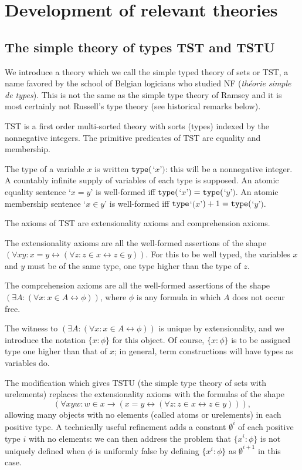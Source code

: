 \documentclass[112pt]{article}
\begin{document}

\section{Development of relevant theories}

\subsection{The simple theory of types TST and TSTU}

We introduce a theory which we call the simple typed theory of sets or TST, a name favored by the school of Belgian logicians who studied NF ({\em th\'eorie simple de types}).  This is not the same as the simple type theory of Ramsey and it is most certainly not Russell's type theory  (see historical remarks below).

TST is a first order multi-sorted theory with sorts (types) indexed by the nonnegative integers.  The primitive predicates of TST are equality and membership.

The type of a variable $x$ is written ${\tt type}($`$x$'$)$:  this will be a nonnegative integer.   A countably infinite supply of variables of each type is supposed.  An atomic equality sentence `$x=y$' is well-formed iff ${\tt type}($`$x$'$)={\tt type}($`$y$'$)$.
An atomic membership sentence `$x \in y$' is well-formed iff ${\tt type}$`$(x$'$)+1 = {\tt type}($`$y$'$)$.

The axioms of TST are extensionality axioms and comprehension axioms.

The extensionality axioms are all the well-formed assertions of the shape $(\forall xy:x=y \leftrightarrow (\forall z:z \in x \leftrightarrow z\in y))$.  For this to be well typed, the variables
$x$ and $y$ must be of the same type, one type higher than the type of $z$.

The comprehension axioms are all the well-formed assertions of the shape $(\exists A:(\forall x:x \in A \leftrightarrow \phi))$, where $\phi$ is any formula in which $A$ does not occur free.

The witness to $(\exists A:(\forall x:x \in A \leftrightarrow \phi))$ is unique by extensionality, and we introduce the notation $\{x:\phi\}$ for this object.  Of course, $\{x:\phi\}$  is to be assigned type one higher than that of $x$;  in general, term constructions will have types as variables do.

The modification which gives TSTU (the simple type theory of sets with urelements) replaces the extensionality axioms with the formulas of the shape $$(\forall xyw:w \in x \rightarrow (x=y \leftrightarrow (\forall z:z \in x \leftrightarrow z\in y))),$$  allowing many objects with no elements (called atoms or urelements)  in each positive type.  A technically useful refinement adds a constant $\emptyset^i$ of each positive type $i$ with no elements:  we can then address the problem that $\{x^i:\phi\}$ is not uniquely defined when $\phi$ is uniformly false by defining $\{x^i:\phi\}$ as $\emptyset^{i+1}$ in this case.
\end{document}
